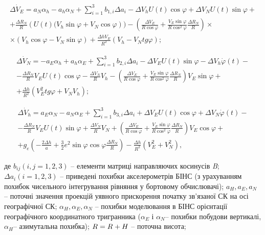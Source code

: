 \[\begin{array}{l} {\Delta \dot{V}_{E} =a_{N} \alpha _{h} -a_{h} \alpha _{N} +\sum 
_{i=1}^{3}b_{1,i}  \Delta a_{i} -\Delta V_{h} U(t)\cos \varphi +\Delta V_{N} U(t)
\sin \varphi +} \\ {+\frac{\Delta R_{N} }{R_{} } \left(U(t)(V_{h} \sin \varphi +V_{N} 
\cos \varphi \right))-(\frac{\Delta V_{E} }{R\cos \varphi } +\frac{V_{E} \sin \varphi 
}{R\cos ^{2} \varphi } \frac{\Delta R_{N} }{R_{} } )\times } \\ {\times (V_{h} \cos 
\varphi -V_{N} \sin \varphi )+\frac{\Delta hV_{E} }{R^{2} } (V_{h} -V_{N} tg\varphi 
);} \end{array}\] 

\begin{equation} \label{eq:__6_5_} \begin{array}{l} {\Delta \dot{V}_{N} =-a_{E} 
\alpha _{h} +a_{h} \alpha _{E} +\sum _{i=1}^{3}b_{2,i}  \Delta a_{i} -\Delta V_{E} 
U(t)\sin \varphi -\Delta V_{h} \dot{\varphi }(t)-} \\ {-\frac{\Delta R_{N} }{R_{} 
} V_{E} U(t)\cos \varphi -\frac{\Delta V_{N} }{R} V_{h} -(\frac{\Delta V_{E} }{R
\cos \varphi } +\frac{V_{E} \sin \varphi }{R\cos ^{2} \varphi } \frac{\Delta R_{N} 
}{R_{} } )V_{E} \sin \varphi +} \\ {+\frac{\Delta h}{R^{2} } (V_{E}^{2} tg\varphi 
+V_{N} V_{h} );} \end{array} \end{equation} 

\[\begin{array}{l} {\Delta \dot{V}_{h} =a_{E} \alpha _{N} -a_{N} \alpha _{E} +\sum 
_{i=1}^{3}b_{3,i}  \Delta a_{i} +\Delta V_{E} U(t)\cos \varphi +\Delta V_{N} \dot{
\varphi }(t)-} \\ {-\frac{\Delta R_{N} }{R_{} } V_{E} U(t)\sin \varphi +\frac{\Delta 
V_{N} }{R} V_{N} +(\frac{\Delta V_{E} }{R\cos \varphi } +\frac{V_{E} \sin \varphi 
}{R\cos ^{2} \varphi } \frac{\Delta R_{N} }{R_{} } )V_{E} \cos \varphi +} \\ {+g_{e} 
\left(-\frac{2\Delta h}{a} +\frac{3}{2} e^{2} \sin \varphi \cos \varphi \frac{\Delta 
R_{N} }{R_{} } \right)-\frac{\Delta h}{R^{2} } \left(V_{E}^{2} +V_{N}^{2} \right),} 
\end{array}\] 



де $b_{ij} \left(i,j=1,2,3\right)$ -- елементи матриці направляючих косинусів \textit{B}; $\Delta 
a_{i} \left(i=1,2,3\right)$ -- приведені похибки акселерометрів БІНС (з урахуванням 
похибок чисельного інтегрування рівняння  у бортовому обчислювачі); $a_{H} ,a_{E} 
,a_{N} $ -- поточні значення проекцій уявного прискорення початку зв'язаної СК на 
осі географічної СК; $\alpha _{H} ,\alpha _{E} ,\alpha _{N} $ -- похибки моделювання 
в БІНС орієнтації географічного координатного тригранника ($\alpha _{E} $ і $\alpha 
_{N} $-- похибки побудови вертикалі, $\alpha _{H} $-- азимутальна похибка); $R=R_{{
\rm }} +H$ -- поточна висота; 

